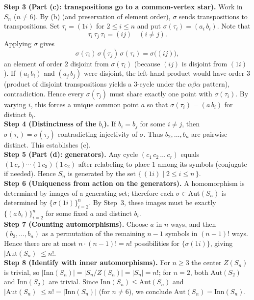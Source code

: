 \documentclass[11pt]{article}
\theoremstyle{definition}
\newcommand{\Aut}{\mathrm{Aut}}
\newcommand{\Inn}{\mathrm{Inn}}
\begin{document}
\textbf{Step 3 (Part (c): transpositions go to a common-vertex star).} Work in $S_n$ ($n\ne 6$). By (b) (and preservation of element order), $\sigma$ sends transpositions to transpositions. Set $\tau_i=(1i)$ for $2\le i\le n$ and put $\sigma(\tau_i)=(a_i\,b_i)$. Note that
\[
\tau_i\,\tau_j\,\tau_i=(ij)\quad (i\ne j).
\]
Applying $\sigma$ gives
\[
\sigma(\tau_i)\,\sigma(\tau_j)\,\sigma(\tau_i)=\sigma\big((ij)\big),
\]
an element of order $2$ disjoint from $\sigma(\tau_i)$ (because $(ij)$ is disjoint from $(1i)$). If $(a_i\,b_i)$ and $(a_j\,b_j)$ were disjoint, the left-hand product would have order $3$ (product of disjoint transpositions yields a $3$-cycle under the $\alpha\beta\alpha$ pattern), contradiction. Hence every $\sigma(\tau_j)$ must share exactly one point with $\sigma(\tau_i)$. By varying $i$, this forces a unique common point $a$ so that $\sigma(\tau_i)=(a\,b_i)$ for distinct $b_i$.\\
\textbf{Step 4 (Distinctness of the $b_i$).} If $b_i=b_j$ for some $i\ne j$, then $\sigma(\tau_i)=\sigma(\tau_j)$ contradicting injectivity of $\sigma$. Thus $b_2,\dots,b_n$ are pairwise distinct. This establishes (c).\\

\textbf{Step 5 (Part (d): generators).} Any cycle $(c_1\,c_2\,\dots\,c_r)$ equals $(1\,c_r)\cdots(1\,c_3)(1\,c_2)$ after relabeling to place $1$ among its symbols (conjugate if needed). Hence $S_n$ is generated by the set $\{\,(1i)\mid 2\le i\le n\,\}$.\\
\textbf{Step 6 (Uniqueness from action on the generators).} A homomorphism is determined by images of a generating set; therefore each $\sigma\in\Aut(S_n)$ is determined by $\{\sigma(1i)\}_{i=2}^n$. By Step~3, these images must be exactly $\{(a\,b_i)\}_{i=2}^n$ for some fixed $a$ and distinct $b_i$.\\
\textbf{Step 7 (Counting automorphisms).} Choose $a$ in $n$ ways, and then $(b_2,\dots,b_n)$ as a permutation of the remaining $n-1$ symbols in $(n-1)!$ ways. Hence there are at most $n\cdot (n-1)!=n!$ possibilities for $\{\sigma(1i)\}$, giving $|\Aut(S_n)|\le n!$.\\
\textbf{Step 8 (Identify with inner automorphisms).} For $n\ge 3$ the center $Z(S_n)$ is trivial, so $|\Inn(S_n)|=|S_n/Z(S_n)|=|S_n|=n!$; for $n=2$, both $\Aut(S_2)$ and $\Inn(S_2)$ are trivial. Since $\Inn(S_n)\le \Aut(S_n)$ and $|\Aut(S_n)|\le n!=|\Inn(S_n)|$ (for $n\ne 6$), we conclude $\Aut(S_n)=\Inn(S_n)$.\\

\newpage
\end{document}
